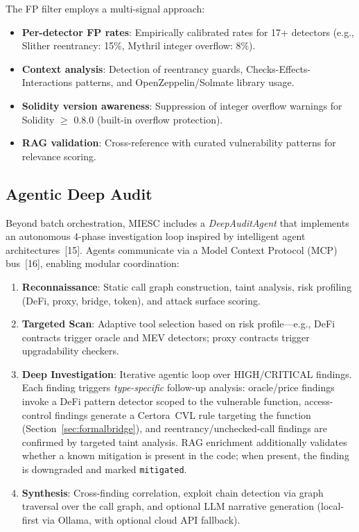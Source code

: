 \documentclass[conference]{IEEEtran}
\begin{document}
The FP filter employs a multi-signal approach:
\begin{itemize}
    \item \textbf{Per-detector FP rates}: Empirically calibrated rates for 17+ detectors (e.g., Slither reentrancy: 15\%, Mythril integer overflow: 8\%).
    \item \textbf{Context analysis}: Detection of reentrancy guards, Checks-Effects-Interactions patterns, and OpenZeppelin/Solmate library usage.
    \item \textbf{Solidity version awareness}: Suppression of integer overflow warnings for Solidity $\geq$ 0.8.0 (built-in overflow protection).
    \item \textbf{RAG validation}: Cross-reference with curated vulnerability patterns for relevance scoring.
\end{itemize}

\subsection{Agentic Deep Audit}
\label{sec:deepaudit}

Beyond batch orchestration, MIESC includes a \emph{DeepAuditAgent} that implements an autonomous 4-phase investigation loop inspired by intelligent agent architectures~[15]. Agents communicate via a Model Context Protocol (MCP) bus~[16], enabling modular coordination:

\begin{enumerate}
    \item \textbf{Reconnaissance}: Static call graph construction, taint analysis, risk profiling (DeFi, proxy, bridge, token), and attack surface scoring.
    \item \textbf{Targeted Scan}: Adaptive tool selection based on risk profile---e.g., DeFi contracts trigger oracle and MEV detectors; proxy contracts trigger upgradability checkers.
    \item \textbf{Deep Investigation}: Iterative agentic loop over HIGH/CRITICAL findings. Each finding triggers \emph{type-specific} follow-up analysis: oracle/price findings invoke a DeFi pattern detector scoped to the vulnerable function, access-control findings generate a Certora~CVL rule targeting the function (Section~\ref{sec:formalbridge}), and reentrancy/unchecked-call findings are confirmed by targeted taint analysis. RAG enrichment additionally validates whether a known mitigation is present in the code; when present, the finding is downgraded and marked \texttt{mitigated}.
    \item \textbf{Synthesis}: Cross-finding correlation, exploit chain detection via graph traversal over the call graph, and optional LLM narrative generation (local-first via Ollama, with optional cloud API fallback).
\end{enumerate}
\end{document}
